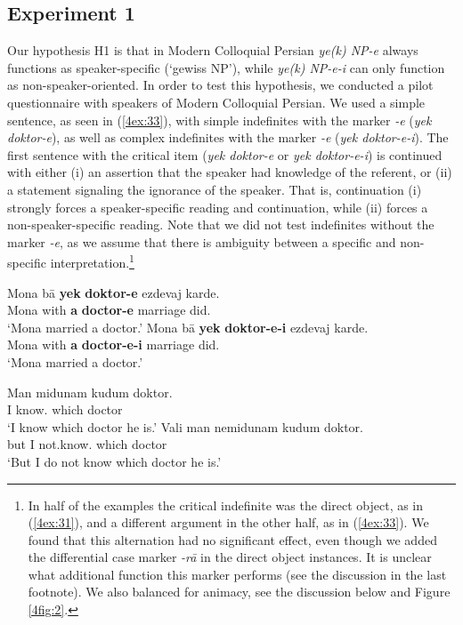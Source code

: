 \documentclass[output=paper]{langsci/langscibook}
\begin{document}
\subsection{Experiment 1}\label{4sec:51}

{
Our hypothesis H1 is that in Modern Colloquial Persian {\emph{ye(k) NP-e}} always functions as speaker-specific (`gewiss NP'), while {\emph{ye(k) NP-e-i}} can only function as non-speaker-oriented. In order to test this hypothesis, we conducted a pilot questionnaire with speakers of Modern Colloquial Persian. We used a simple sentence, as seen in (\ref{4ex:33}), with simple indefinites with the marker {\emph{-e}} ({\emph{yek doktor-e}}), as well as complex indefinites with the marker {\emph{-e}} ({\emph{yek doktor-e-i}}). The first sentence with the critical item ({\emph{yek doktor-e}} or {\emph{yek doktor-e-i}}) is continued with either (i) an assertion that the speaker had knowledge of the referent, or (ii) a statement signaling the ignorance of the speaker. That is, continuation (i) strongly forces a speaker-specific reading and continuation, while (ii) forces a non-speaker-specific reading. Note that we did not test indefinites without the marker {\emph{-e}}, as we assume that there is ambiguity between a specific and non-specific interpretation.\footnote{In half of the examples the critical indefinite was the direct object, as in (\ref{4ex:31}), and a different argument in the other half, as in (\ref{4ex:33}). We found that this alternation had no significant effect, even though we added the differential case marker {\emph{-rā}} in the direct object instances. It is unclear what additional function this marker performs (see the discussion in the last footnote). We also balanced for animacy, see the discussion below and Figure \ref{4fig:2}.}
}

\begin{exe}
\ex\label{4ex:33}
	\begin{xlista}
	\ex\label{4ex:33a}
	\gll	Mona bā  		{\bf{yek}} {\bf{doktor-e}}  	ezdevaj karde. \\
		Mona with  	{\bf{a}} {\bf{doctor-e}}  	marriage did.{} \\
	\glt	`Mona married a doctor.'
	\ex\label{4ex:33b}
	\gll	Mona bā  	{\bf{yek}} {\bf{doktor-e-i}}  	ezdevaj karde. \\
		Mona with  	{\bf{a}} {\bf{doctor-e-i}}  	marriage did.{} \\
	\glt	`Mona married a doctor.'
		\begin{xlista}
		\gll	Man midunam kudum 	doktor. \\
			I  	 know.{}	which	doctor \\
		\glt	`I know which doctor he is.'
		\gll	Vali man nemidunam    	kudum 	doktor. \\
			but  I       not.know.{}    which    doctor \\
		\glt	`But I do not know which doctor he is.'
		\end{xlista}
	\end{xlista}
\end{exe}
\end{document}
